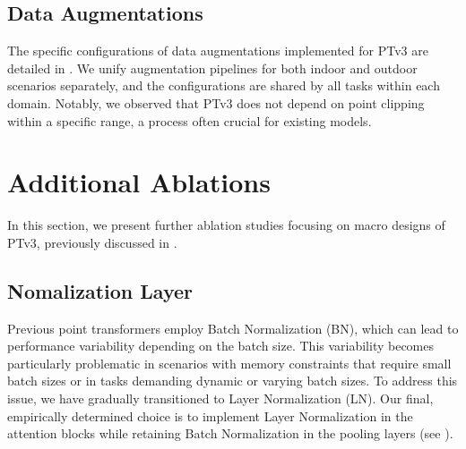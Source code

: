 \vspace{-1mm}
\subsection{Data Augmentations}
\vspace{-1mm}
The specific configurations of data augmentations implemented for PTv3 are detailed in . We unify augmentation pipelines for both indoor and outdoor scenarios separately, and the configurations are shared by all tasks within each domain. Notably, we observed that PTv3 does not depend on point clipping within a specific range, a process often crucial for existing models.

\begin{table}[!t]
    \begin{minipage}{0.48\textwidth}
    \centering
        
        \vspace{-3mm}
        \caption{\textbf{ScanNet V2 semantic segmentation.} }\label{tab:appendix_scannet}
        \vspace{-6mm}
    \end{minipage}
\end{table}

\section{Additional Ablations}
In this section, we present further ablation studies focusing on macro designs of PTv3, previously discussed in .

\begin{table}[!t]
    \begin{minipage}{0.48\textwidth}
    \centering
        
        \vspace{-3mm}
        \caption{\textbf{S3DIS semantic segmentation.} }\label{tab:appendix_s3dis}
        \vspace{-6mm}
    \end{minipage}
\end{table}

\subsection{Nomalization Layer}
Previous point transformers employ Batch Normalization (BN), which can lead to performance variability depending on the batch size. This variability becomes particularly problematic in scenarios with memory constraints that require small batch sizes or in tasks demanding dynamic or varying batch sizes. To address this issue, we have gradually transitioned to Layer Normalization (LN). Our final, empirically determined choice is to implement Layer Normalization in the attention blocks while retaining Batch Normalization in the pooling layers (see ).

